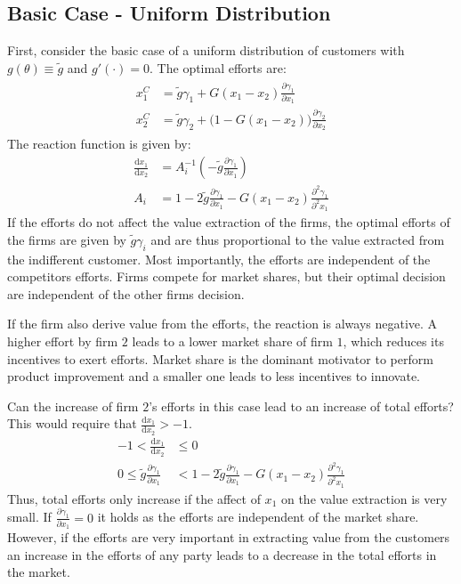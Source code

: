 \documentclass[a4paper, 11pt]{article}
\renewcommand{\d}{\text{d}}
\begin{document}
\subsection{Basic Case - Uniform Distribution}
First, consider the basic case of a uniform distribution of customers with $g(\theta)\equiv\tilde{g}$ and $g'(\cdot)=0$. The optimal efforts are:
\begin{align}
\begin{split}
x_1^C &= \tilde{g}\gamma_1 + G(x_1-x_2)\frac{\partial \gamma_1}{\partial x_1}\\
x_2^C &= \tilde{g}\gamma_2 + \big(1-G(x_1-x_2)\big)\frac{\partial \gamma_2}{\partial x_2}
\end{split}
\end{align}
The reaction function is given by:
\begin{align*}
\frac{\d x_1}{\d x_2} &= A_i^{-1} \left( -\tilde{g}\frac{\partial \gamma_1}{\partial x_1}\right)\\
A_i &= 1 -2\tilde{g}\frac{\partial \gamma_1}{\partial x_1}-G(x_1-x_2)\frac{\partial^2 \gamma_1}{\partial^2 x_1}
\end{align*}
If the efforts do not affect the value extraction of the firms, the optimal efforts of the firms are given by $\tilde{g}\gamma_i$ and are thus proportional to the value extracted from the indifferent customer. Most importantly, the efforts are independent of the competitors efforts. Firms compete for market shares, but their optimal decision are independent of the other firms decision.

If the firm also derive value from the efforts, the reaction is always negative. A higher effort by firm $2$ leads to a lower market share of firm $1$, which reduces its incentives to exert efforts. Market share is the dominant motivator to perform product improvement and a smaller one leads to less incentives to innovate. 

Can the increase of firm $2$'s efforts in this case lead to an increase of total efforts? This would require that $\frac{\d x_1}{\d x_2} >-1$.
\begin{align*}
-1<\frac{\d x_1}{\d x_2}&\leq0\\
0\leq\tilde{g}\frac{\partial \gamma_1}{\partial x_1}&<1 -2\tilde{g}\frac{\partial \gamma_1}{\partial x_1}-G(x_1-x_2)\frac{\partial^2 \gamma_1}{\partial^2 x_1}
\end{align*}
Thus, total efforts only increase if the affect of $x_1$ on the value extraction is very small. If $\frac{\partial \gamma_1}{\partial x_1}=0$ it holds as the efforts are independent of the market share. However, if the efforts are very important in extracting value from the customers an increase in the efforts of any party leads to a decrease in the total efforts in the market.
\end{document}
